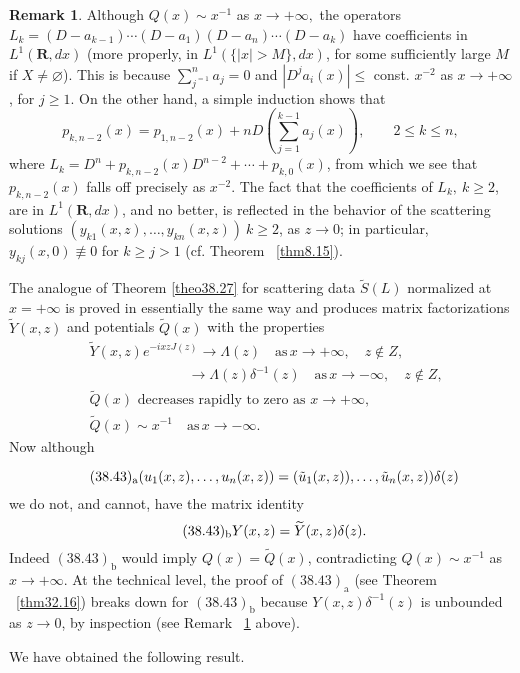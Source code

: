 \documentclass{surv-l}
\theoremstyle{plain}
\theoremstyle{definition}
\newtheorem{remark}[theorem]{Remark}
\numberwithin{equation}{chapter}
\begin{document}
\setcounter{theorem}{40}
\begin{remark}\label{rem38.41}  Although $Q(x)\sim x^{-1}$ as $x\rightarrow+\infty,$ the operators $L_{k}= (D-a_{k-1})\cdots(D-a_{1})(D-a_{n})\cdots(D-a_{k})$ have coefficients in $L^{1}(\mathbf{R}, dx)$ (more properly, in $L^{1}(\{|x|>M\},dx)$, for some sufficiently large $M$ if $ X\neq\varnothing$). This is because $\sum_{j^{=1}}^{n}a_{j}=0$ and $|D^{j}a_{i}(x) |\leq$ const. $x^{-2}$ as $ x\rightarrow+\infty$, for $j\geq 1$. On the other hand, a simple induction shows that
\setcounter{equation}{41}
\begin{equation}\label{eq38.42}
p_{k,n-2}(x)=p_{1,n-2}(x)+nD\left(\sum_{j=1}^{k-1}a_{j}(x)\right),\qquad 2\leq k\leq n,
\end{equation}
where $L_{k}=D^{n}+p_{k,n-2}(x)D^{n-2}+\cdots+p_{k,0}(x)$, from which we see that $p_{k,n-2}(x)$ falls off precisely as $x^{-2}$. The fact that the coefficients of $L_{k},\ k\geq 2$, are in $L^{1}(\mathbf{R}, dx)$, and no better, is reflected in the behavior of the scattering solutions $(y_{k1}(x, z),\ldots,y_{kn}(x, z))\ k\geq 2$, as $z\rightarrow 0$; in particular, $y_{kj}(x, 0)\not\equiv 0$ for $ k\geq j>1$ (cf. Theorem ~\ref{thm8.15}).

The analogue of Theorem \ref{theo38.27} for scattering data $\tilde{S}(L)$ normalized at $x= +\infty$ is proved in essentially the same way and produces matrix factorizations $\tilde{Y}(x, z)$ and potentials $\tilde{Q}(x)$ with the properties
\begin{align*}
&\tilde{Y}(x, z)e^{-ixzJ(z)}\rightarrow\Lambda(z)\quad \mathrm{as}\,  x\rightarrow+\infty,\quad z\not\in Z,\\
&\qquad\qquad\qquad\quad\rightarrow\Lambda(z)\delta^{-1}(z)\quad \mathrm{as}\,  x\rightarrow-\infty,\quad z\not\in Z,\\
&\tilde{Q}(x) \text{ decreases rapidly to zero as }  x\rightarrow+\infty,\\
&\tilde{Q}(x)\sim x^{-1}\quad \mathrm{as}\,  x\rightarrow-\infty.
\end{align*}
Now although

\begin{equation*}
\tag*{$(38.43)_{\mathrm{a}}$}(u_{1}(x, z),\ldots,u_{n}(x, z))=(\tilde{u}_{1}(x, z)),\ldots,\tilde{u}_{n}(x,z))\delta(z)
\end{equation*}
we do not, and cannot, have the matrix identity
\begin{equation*}
\tag*{$(38.43)_{\mathrm{b}}$} Y(x, z)=\widetilde{Y}(x, z)\delta(z).
\end{equation*}
Indeed $(38.43)_{\mathrm{b}}$ would imply $Q(x)=\tilde{Q}(x)$, contradicting $Q(x)\sim x^{-1}$ as $ x\rightarrow +\infty$. At the technical level, the proof of $(38.43)_{\mathrm{a}}$ (see Theorem ~\ref{thm32.16}) breaks down for $(38.43)_{\mathrm{b}}$ because $Y(x, z)\delta^{-1}(z)$ is unbounded as $z\rightarrow 0$, by inspection (see Remark ~\ref{rem38.41} above).

We have obtained the following result.
\end{remark}
\end{document}
